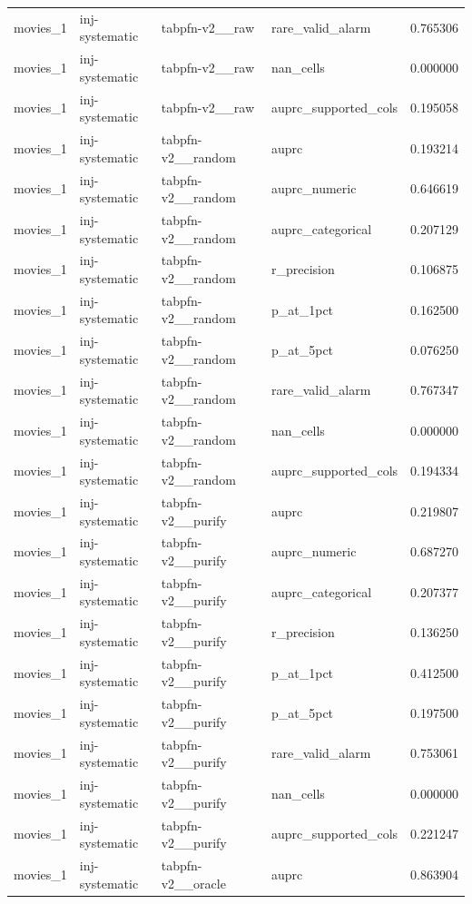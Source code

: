 \begin{tabular}{lllll}
movies\_1 & inj-systematic & tabpfn-v2\_\_raw & rare\_valid\_alarm & 0.765306 \\
movies\_1 & inj-systematic & tabpfn-v2\_\_raw & nan\_cells & 0.000000 \\
movies\_1 & inj-systematic & tabpfn-v2\_\_raw & auprc\_supported\_cols & 0.195058 \\
movies\_1 & inj-systematic & tabpfn-v2\_\_random & auprc & 0.193214 \\
movies\_1 & inj-systematic & tabpfn-v2\_\_random & auprc\_numeric & 0.646619 \\
movies\_1 & inj-systematic & tabpfn-v2\_\_random & auprc\_categorical & 0.207129 \\
movies\_1 & inj-systematic & tabpfn-v2\_\_random & r\_precision & 0.106875 \\
movies\_1 & inj-systematic & tabpfn-v2\_\_random & p\_at\_1pct & 0.162500 \\
movies\_1 & inj-systematic & tabpfn-v2\_\_random & p\_at\_5pct & 0.076250 \\
movies\_1 & inj-systematic & tabpfn-v2\_\_random & rare\_valid\_alarm & 0.767347 \\
movies\_1 & inj-systematic & tabpfn-v2\_\_random & nan\_cells & 0.000000 \\
movies\_1 & inj-systematic & tabpfn-v2\_\_random & auprc\_supported\_cols & 0.194334 \\
movies\_1 & inj-systematic & tabpfn-v2\_\_purify & auprc & 0.219807 \\
movies\_1 & inj-systematic & tabpfn-v2\_\_purify & auprc\_numeric & 0.687270 \\
movies\_1 & inj-systematic & tabpfn-v2\_\_purify & auprc\_categorical & 0.207377 \\
movies\_1 & inj-systematic & tabpfn-v2\_\_purify & r\_precision & 0.136250 \\
movies\_1 & inj-systematic & tabpfn-v2\_\_purify & p\_at\_1pct & 0.412500 \\
movies\_1 & inj-systematic & tabpfn-v2\_\_purify & p\_at\_5pct & 0.197500 \\
movies\_1 & inj-systematic & tabpfn-v2\_\_purify & rare\_valid\_alarm & 0.753061 \\
movies\_1 & inj-systematic & tabpfn-v2\_\_purify & nan\_cells & 0.000000 \\
movies\_1 & inj-systematic & tabpfn-v2\_\_purify & auprc\_supported\_cols & 0.221247 \\
movies\_1 & inj-systematic & tabpfn-v2\_\_oracle & auprc & 0.863904 \\

\end{tabular}
